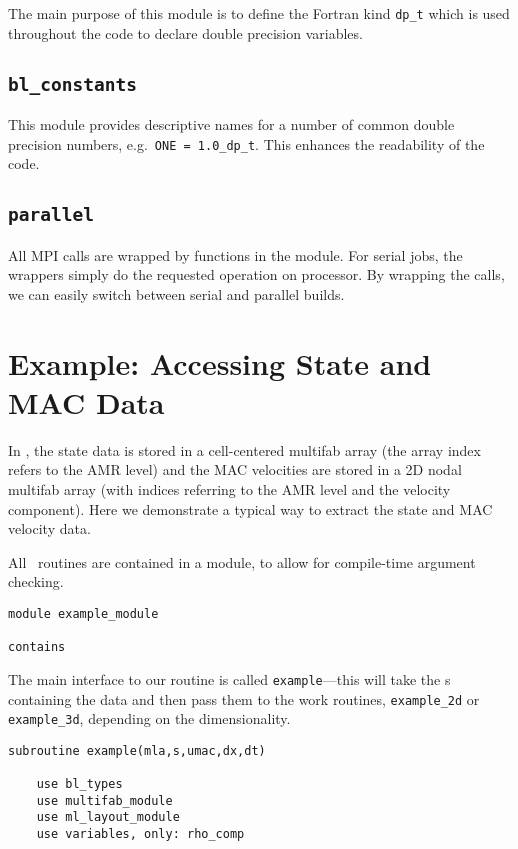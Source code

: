 The main purpose of this module is to define the Fortran kind {\tt dp\_t}
which is used throughout the code to declare double precision variables.

\subsection{{\tt bl\_constants}}

This module provides descriptive names for a number of common double precision
numbers, e.g.\ {\tt ONE = 1.0\_dp\_t}.  This enhances the readability of
the code.

\subsection{{\tt parallel}}

All MPI calls are wrapped by functions in the  module.  For
serial jobs, the wrappers simply do the requested operation on processor.
By wrapping the calls, we can easily switch between serial and parallel
builds.

\section{\label{sec:example} Example: Accessing State and MAC Data}

In \maestro, the state data is stored in a cell-centered multifab array
(the array index refers to the AMR level) and the MAC velocities are
stored in a 2D nodal multifab array (with indices referring to the AMR
level and the velocity component).  Here we demonstrate a typical way
to extract the state and MAC velocity data.

All \maestro\ routines are contained in a module, to allow for compile-time
argument checking.
\begin{lstlisting}[language={[95]fortran},mathescape=false]
module example_module

contains
\end{lstlisting}

The main interface to our routine is called {\tt example}---this will
take the \multifab s containing the data and then pass them to the
work routines, {\tt example\_2d} or {\tt example\_3d}, depending on
the dimensionality.  
\begin{lstlisting}[language={[95]fortran},mathescape=false]
  subroutine example(mla,s,umac,dx,dt)

    use bl_types
    use multifab_module
    use ml_layout_module
    use variables, only: rho_comp
\end{lstlisting}


